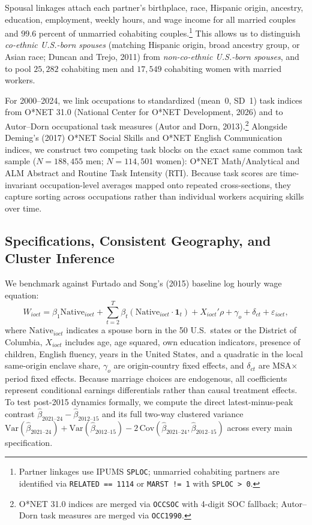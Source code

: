 \documentclass[11pt]{article}
\begin{document}
Spousal linkages attach each partner's birthplace, race, Hispanic origin, ancestry, education, employment, weekly hours, and wage income for all married couples and $99.6$ percent of unmarried cohabiting couples.\footnote{Partner linkages use IPUMS \texttt{SPLOC}; unmarried cohabiting partners are identified via \texttt{RELATED == 1114} or \texttt{MARST != 1} with \texttt{SPLOC > 0}.} This allows us to distinguish \emph{co-ethnic U.S.-born spouses} (matching Hispanic origin, broad ancestry group, or Asian race; Duncan and Trejo, 2011) from \emph{non-co-ethnic U.S.-born spouses}, and to pool $25{,}282$ cohabiting men and $17{,}549$ cohabiting women with married workers.

For 2000--2024, we link occupations to standardized (mean~0, SD~1) task indices from O*NET 31.0 (National Center for O*NET Development, 2026) and to Autor--Dorn occupational task measures (Autor and Dorn, 2013).\footnote{O*NET 31.0 indices are merged via \texttt{OCCSOC} with 4-digit SOC fallback; Autor--Dorn task measures are merged via \texttt{OCC1990}.} Alongside Deming's (2017) O*NET Social Skills and O*NET English Communication indices, we construct two competing task blocks on the exact same common task sample ($N = 188{,}455$ men; $N = 114{,}501$ women): O*NET Math/Analytical and ALM Abstract and Routine Task Intensity (RTI). Because task scores are time-invariant occupation-level averages mapped onto repeated cross-sections, they capture sorting across occupations rather than individual workers acquiring skills over time.

\subsection{Specifications, Consistent Geography, and Cluster Inference}
We benchmark against Furtado and Song's (2015) baseline log hourly wage equation:
\begin{equation}
W_{ioct} = \beta_1 \text{Native}_{ioct} + \sum_{t=2}^{T} \beta_t \left(\text{Native}_{ioct} \cdot \mathbf{1}_t\right) + X_{ioct}'\rho + \gamma_o + \delta_{ct} + \varepsilon_{ioct},
\end{equation}
where $\text{Native}_{ioct}$ indicates a spouse born in the 50 U.S.\ states or the District of Columbia, $X_{ioct}$ includes age, age squared, own education indicators, presence of children, English fluency, years in the United States, and a quadratic in the local same-origin enclave share, $\gamma_o$ are origin-country fixed effects, and $\delta_{ct}$ are MSA$\times$period fixed effects. Because marriage choices are endogenous, all coefficients represent conditional earnings differentials rather than causal treatment effects. To test post-2015 dynamics formally, we compute the direct latest-minus-peak contrast $\hat{\beta}_{2021\text{--}24} - \hat{\beta}_{2012\text{--}15}$ and its full two-way clustered variance $\text{Var}(\hat{\beta}_{2021\text{--}24}) + \text{Var}(\hat{\beta}_{2012\text{--}15}) - 2\,\text{Cov}(\hat{\beta}_{2021\text{--}24}, \hat{\beta}_{2012\text{--}15})$ across every main specification.
\end{document}
